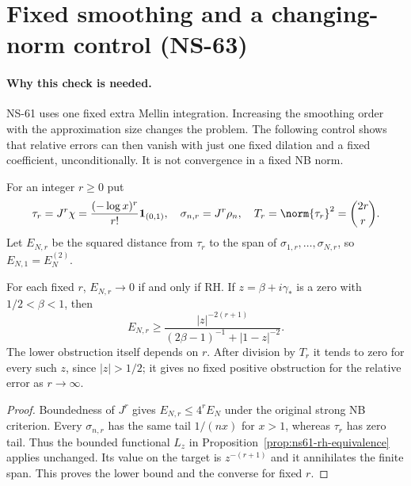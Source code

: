 \section{Fixed smoothing and a changing-norm control (NS-63)}
\label{sec:ns63-changing-norm}

\paragraph{Why this check is needed.}
NS-61 uses one fixed extra Mellin integration. Increasing the smoothing
order with the approximation size changes the problem. The following
control shows that relative errors can then vanish with just one fixed
dilation and a fixed coefficient, unconditionally. It is not convergence
in a fixed NB norm.

For an integer $r\geq0$ put
\[
 \tau_r=J^r\chi=\frac{(-\log x)^r}{r!}\mathbf1_{(0,1)},\quad
 \sigma_{n,r}=J^r\rho_n,\quad
 T_r=\norm{\tau_r}^2=\binom{2r}{r}.
\]
Let $E_{N,r}$ be the squared distance from $\tau_r$ to the span of
$\sigma_{1,r},\ldots,\sigma_{N,r}$, so $E_{N,1}=E_N^{(2)}$.

\begin{proposition}
\label{prop:ns63-fixed-order}
For each fixed $r$, $E_{N,r}\to0$ if and only if RH. If
$z=\beta+i\gamma_*$ is a zero with $1/2<\beta<1$, then
\[
 E_{N,r}\geq
 \frac{|z|^{-2(r+1)}}{(2\beta-1)^{-1}+|1-z|^{-2}}.
\]
The lower obstruction itself depends on $r$. After division by $T_r$
it tends to zero for every such $z$, since $|z|>1/2$; it gives no
fixed positive obstruction for the relative error as $r\to\infty$.
\end{proposition}
\begin{proof}
Boundedness of $J^r$ gives $E_{N,r}\leq4^rE_N$ under the original
strong NB criterion. Every $\sigma_{n,r}$ has the same tail $1/(nx)$
for $x>1$, whereas $\tau_r$ has zero tail. Thus the bounded functional
$L_z$ in Proposition~\ref{prop:ns61-rh-equivalence} applies unchanged.
Its value on the target is $z^{-(r+1)}$ and it annihilates the finite
span. This proves the lower bound and the converse for fixed $r$.
\end{proof}

